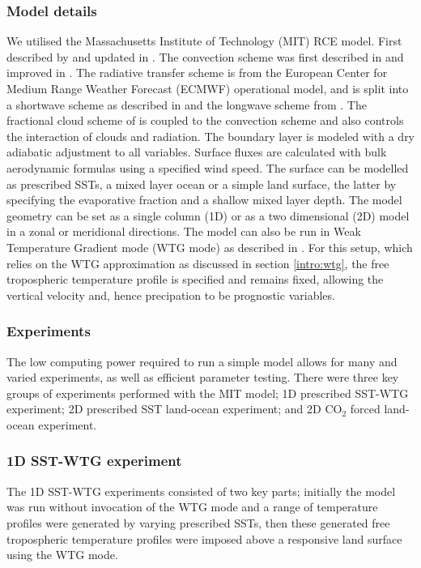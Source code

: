 \subsubsection{Model details}
We utilised the Massachusetts Institute of Technology (MIT) RCE model. First 
described by \citet{Renno1994} and updated in \citet{Bony2001}.  The convection 
scheme was first described in \citet{Emanuel1991} and improved in 
\citet{Emanuel1999}. The radiative transfer scheme is from the European Center 
for Medium Range Weather Forecast (ECMWF) operational model, and is split into a 
shortwave scheme as described in \citet{Fouquart1980} and the longwave scheme 
from \citet{Morcrete1991a}. The fractional cloud scheme of \citet{Bony2001} is 
coupled to the convection scheme and also controls the interaction of clouds and 
radiation. The boundary layer is modeled with a dry adiabatic adjustment to all 
variables. Surface fluxes are calculated with bulk aerodynamic formulas using a 
specified wind speed.  The surface can be modelled as prescribed SSTs, a mixed 
layer ocean or a simple land surface, the latter by specifying the evaporative 
fraction and a shallow mixed layer depth. The model geometry can be set as a 
single column (1D) or as a two dimensional (2D) model in a zonal or meridional 
directions. The model can also be run in Weak Temperature Gradient mode (WTG 
mode) as described in \citet{Sobel200}. For this setup, which relies on the WTG 
approximation as discussed in section \ref{intro:wtg}, the free tropospheric 
temperature profile is specified and remains fixed, allowing the vertical 
velocity and, hence precipation to be prognostic variables.

\subsubsection{Experiments}
The low computing power required to run a simple model allows for many and 
varied experiments, as well as efficient parameter testing. There were three key 
groups of experiments performed with the MIT model; 1D prescribed SST-WTG 
experiment; 2D prescribed SST land-ocean experiment; and 2D CO$_2$ forced 
land-ocean experiment.

\subsubsection{1D SST-WTG experiment}
The 1D SST-WTG experiments consisted of two key parts; initially the model was 
run without invocation of the WTG mode and a range of temperature profiles were 
generated by varying prescribed SSTs, then these generated free tropospheric 
temperature profiles were imposed above a responsive land surface using the WTG 
mode. 

